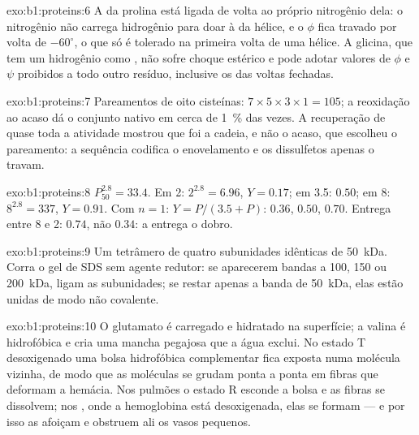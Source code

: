 \begin{solution}{exo:b1:proteins:6}
A  da prolina está ligada de volta ao próprio nitrogênio
dela: o nitrogênio não carrega hidrogênio para doar à  da hélice, e o $\phi$ fica travado por volta de $-60^\circ$,
o que só é tolerado na primeira volta de uma hélice. A glicina, que tem
um hidrogênio como , não sofre choque estérico e pode
adotar valores de $\phi$ e $\psi$ proibidos a todo outro resíduo,
inclusive os das voltas fechadas.
\end{solution}

\begin{solution}{exo:b1:proteins:7}
Pareamentos de oito cisteínas: $7\times 5\times 3\times 1 = 105$; a
reoxidação ao acaso dá o conjunto nativo em cerca de \qty{1}{\%} das
vezes. A recuperação de quase toda a atividade mostrou que foi a cadeia,
e não o acaso, que escolheu o pareamento: a sequência codifica o
enovelamento e os dissulfetos apenas o travam.
\end{solution}

\begin{solution}{exo:b1:proteins:8}
$P_{50}^{2.8} = 33.4$. Em 2: $2^{2.8} = 6.96$, $Y = 0.17$; em 3.5:
$0.50$; em 8: $8^{2.8} = 337$, $Y = 0.91$. Com $n = 1$: $Y =
P/(3.5 + P)$: $0.36$, $0.50$, $0.70$. Entrega entre 8 e 2: 
$0.74$, não  $0.34$: a   entrega o dobro.
\end{solution}

\begin{solution}{exo:b1:proteins:9}
Um tetrâmero de quatro subunidades idênticas de \qty{50}{kDa}. Corra o
gel de SDS sem agente redutor: se aparecerem bandas a 100, 150 ou
\qty{200}{kDa},  ligam as subunidades; se restar
apenas a banda de \qty{50}{kDa}, elas estão unidas de modo não
covalente.
\end{solution}

\begin{solution}{exo:b1:proteins:10}
O glutamato é carregado e hidratado na superfície; a valina é
hidrofóbica e cria uma mancha pegajosa que a água exclui. No estado T
desoxigenado uma bolsa hidrofóbica complementar fica exposta numa
molécula vizinha, de modo que as moléculas se grudam ponta a ponta em
fibras que deformam a hemácia. Nos pulmões o estado R esconde a bolsa e
as fibras se dissolvem; nos , onde a hemoglobina está
desoxigenada, elas se formam --- e por isso as  afoiçam e
obstruem ali os vasos pequenos.
\end{solution}

